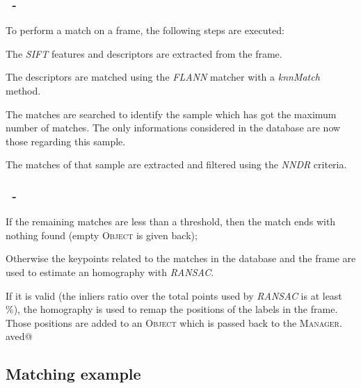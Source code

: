 \documentclass{beamer}
\makeatletter
\newenvironment{cenumerate}{
  \enumerate
  \setcounter{\@enumctr}{\csname saved@\@enumctr\endcsname}
}{
  \expandafter\xdef\csname saved@\@enumctr\endcsname{\the\value{\@enumctr}}
  \endenumerate
}
\newenvironment{cenumerate*}{
  \enumerate
}{
  \expandafter\xdef\csname saved@\@enumctr\endcsname{\the\value{\@enumctr}}
  \endenumerate
}
\makeatother
\begin{document}
  \begin{frame}
    \frametitle{\insertsection\ - \insertsubsection}
    To perform a match on a frame, the following steps are executed:
    \begin{cenumerate*}
      \item The \emph{SIFT} features and descriptors are extracted from the
        frame.
      \item The descriptors are matched using the \emph{FLANN} matcher with
        a \emph{knnMatch} method.
      \item The matches are searched to identify the sample which has got 
        the maximum number of matches. The only informations considered in
        the database are now those regarding this sample.
      \item The matches of that sample are extracted and filtered using the
        \emph{NNDR} criteria.
    \end{cenumerate*}
  \end{frame}

  \begin{frame}
    \frametitle{\insertsection\ - \insertsubsection}
    \begin{cenumerate}
      \item If the remaining matches are less than a threshold, then the
	 	match ends with nothing found (empty \textsc{Object} is given back);
      \item Otherwise the keypoints related to the matches in the database and
        the frame are used to estimate an homography with \emph{RANSAC}.
      \item If it is valid (the inliers ratio over the total points used by
        \emph{RANSAC} is at least \unit[50]{\%}), the homography is used to
        remap the positions of the labels in the frame. Those positions are
        added to an \textsc{Object} which is passed back to the
        \textsc{Manager}.\\
    \end{cenumerate}
  \end{frame}

  \subsection{Matching example}
\end{document}
